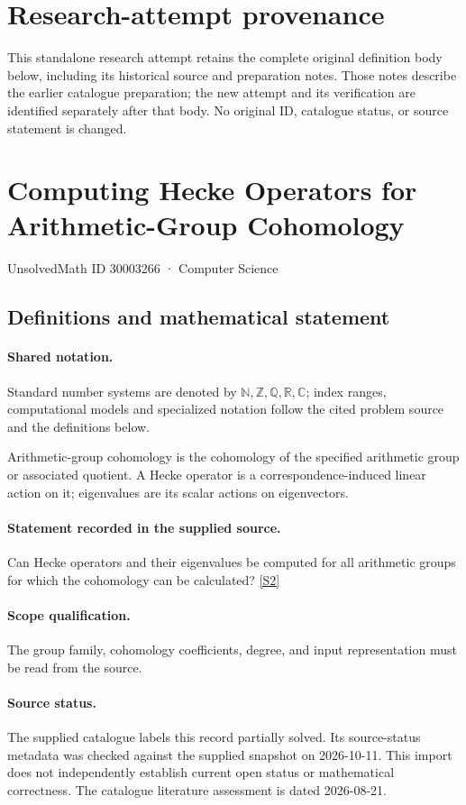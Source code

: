 \documentclass[11pt]{article}
\begin{document}
\section*{Research-attempt provenance}
This standalone research attempt retains the complete original definition body below,
including its historical source and preparation notes. Those notes describe the
earlier catalogue preparation; the new attempt and its verification are identified
separately after that body. No original ID, catalogue status, or source statement is changed.

\section{Computing Hecke Operators for Arithmetic-Group Cohomology}\label{30003266}
{\small UnsolvedMath ID 30003266 · Computer Science}
\subsection{Definitions and mathematical statement}

\paragraph{Shared notation.}Standard number systems are denoted by $\mathbb N,\mathbb Z,\mathbb Q,\mathbb R,\mathbb C$; index ranges, computational models and specialized notation follow the cited problem source and the definitions below.


Arithmetic-group cohomology is the cohomology of the specified arithmetic group or associated quotient. A Hecke operator is a correspondence-induced linear action on it; eigenvalues are its scalar actions on eigenvectors.
\paragraph{Statement recorded in the supplied source.}
Can Hecke operators and their eigenvalues be computed for all arithmetic groups for which the cohomology can be calculated? \href{https://doi.org/10.4171/owr/2016/52}{[S2]}
\paragraph{Scope qualification.}
The group family, cohomology coefficients, degree, and input representation must be read from the source.
\paragraph{Source status.}
The supplied catalogue labels this record partially solved. Its source-status metadata was checked against the supplied snapshot on 2026-10-11. This import does not independently establish current open status or mathematical correctness. The catalogue literature assessment is dated 2026-08-21.
\end{document}
